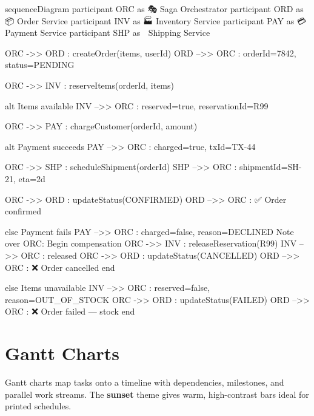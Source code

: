 \documentclass[12pt, a4paper]{article}
\newcommand{\term}[1]{{\sffamily\bfseries\color{mmd-ocean-kw}#1}}
\begin{document}
\begin{mermaid}[
    type    = sequence,
    theme   = midnight,
    caption = {Saga pattern — distributed order transaction with compensations},
    label   = {fig:saga},
    width   = \linewidth
]
sequenceDiagram
    participant ORC as 🎭 Saga Orchestrator
    participant ORD as 📦 Order Service
    participant INV as 🏭 Inventory Service
    participant PAY as 💳 Payment Service
    participant SHP as 🚚 Shipping Service

    ORC ->> ORD : createOrder(items, userId)
    ORD -->> ORC : orderId=7842, status=PENDING

    ORC ->> INV : reserveItems(orderId, items)

    alt Items available
        INV -->> ORC : reserved=true, reservationId=R99

        ORC ->> PAY : chargeCustomer(orderId, amount)

        alt Payment succeeds
            PAY -->> ORC : charged=true, txId=TX-44

            ORC ->> SHP : scheduleShipment(orderId)
            SHP -->> ORC : shipmentId=SH-21, eta=2d

            ORC ->> ORD : updateStatus(CONFIRMED)
            ORD -->> ORC : ✅ Order confirmed

        else Payment fails
            PAY -->> ORC : charged=false, reason=DECLINED
            Note over ORC: Begin compensation
            ORC ->> INV : releaseReservation(R99)
            INV -->> ORC : released
            ORC ->> ORD : updateStatus(CANCELLED)
            ORD -->> ORC : ❌ Order cancelled
        end

    else Items unavailable
        INV -->> ORC : reserved=false, reason=OUT_OF_STOCK
        ORC ->> ORD : updateStatus(FAILED)
        ORD -->> ORC : ❌ Order failed — stock
    end
\end{mermaid}

\section{Gantt Charts}

Gantt charts map tasks onto a timeline with dependencies,
milestones, and parallel work streams.  The \term{sunset} theme
gives warm, high-contrast bars ideal for printed schedules.
\end{document}
